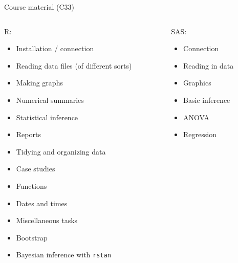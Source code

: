 \documentclass[
  ignorenonframetext,
]{beamer}
\begin{document}
\begin{frame}{Course material (C33)}
\protect\hypertarget{course-material-c33}{}

\begin{columns}
  \begin{column}{0.6\textwidth}
    R:
    \begin{itemize}
\item Installation / connection
\item Reading data files (of different sorts)
\item Making graphs
\item Numerical summaries
\item Statistical inference
\item Reports
\item Tidying and organizing data
\item Case studies
\item Functions
\item Dates and times
\item Miscellaneous tasks
\item Bootstrap
\item Bayesian inference with \texttt{rstan}

    \end{itemize}
  \end{column}
  
  \begin{column}{0.4\textwidth}
  SAS:
  \begin{itemize}
  \item Connection 
\item Reading in data
\item Graphics
\item Basic inference
\item ANOVA
\item Regression 
  
  \end{itemize}
  \end{column}
\end{columns}

\end{frame}
\end{document}
